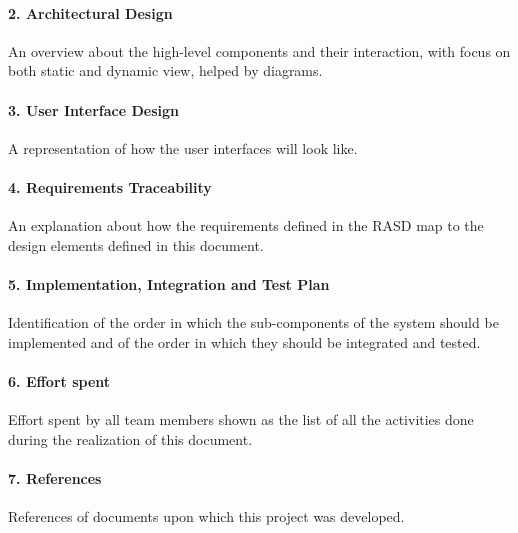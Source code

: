 \documentclass[../DD.tex]{subfiles}
\begin{document}
		\paragraph{2. Architectural Design}
		An overview about the high-level components	and	their interaction, with focus on both static and dynamic view, helped by diagrams.
		\paragraph{3. User Interface Design}
		A representation of how the user interfaces will look like.
		\paragraph{4. Requirements Traceability}
		An explanation about how the requirements defined in the RASD map to the design elements defined in this document.
		\paragraph{5. Implementation, Integration and Test Plan}
		Identification of the order in which the sub-components of the system should be implemented and of the order in which they should be integrated and tested.
		\paragraph{6. Effort spent}
		Effort spent by all team members shown as the list of all the activities done during the realization of this document.
		\paragraph{7. References}
		References of documents upon which this project was developed.
		
		
		
\end{document}
